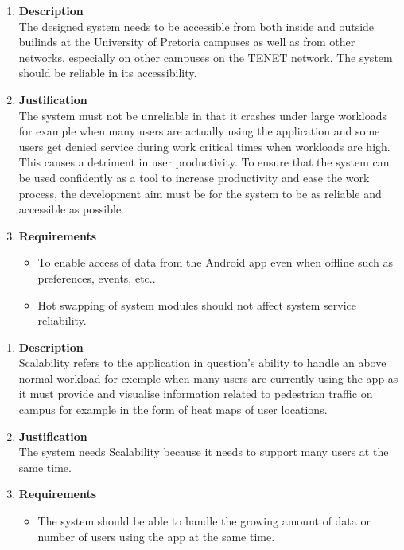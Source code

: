 \documentclass[a4paper,10pt]{article}
\begin{document}
\begin{enumerate}
\item \textbf{Description} \\
The designed system needs to be accessible from both inside and outside builinds at the University of Pretoria campuses as well as from other networks, especially on other campuses on the TENET network. The system should be reliable in its accessibility.
\item \textbf{Justification} \\ 
The system must not be unreliable in that it crashes under large workloads for example when many users are actually using the application and some users get denied service during work critical times when workloads are high. This causes a detriment in user productivity. To ensure that the system can be used confidently as a tool to increase productivity and ease the work process, the development aim must be for the system to be as reliable and accessible as possible.
\item \textbf{Requirements}
	\begin{itemize}
		\item To enable access of data from the Android app even when offline such as preferences, events, etc..
		\item Hot swapping of system modules should not affect system service reliability.
	\end{itemize}
\end{enumerate}
\begin{enumerate}
\item \textbf{Description} \\
Scalability refers to the application in question's ability to handle an above normal workload for exemple when many users are currently using the app as it must provide and visualise information related to pedestrian traffic on campus for example in the form of heat maps of user locations.
\item \textbf{Justification} \\
The system needs Scalability because it needs to support many users at the same time.
\item \textbf{Requirements}
	\begin{itemize}
		\item The system should be able to handle the growing amount of data or number of users using the app at the same time.
	\end{itemize}
\end{enumerate}
\end{document}
